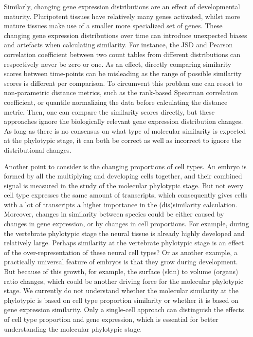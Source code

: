 Similarly, changing gene expression distributions are an effect of developmental maturity\cite{Kannan2021}. Pluripotent tissues have relatively many genes activated, whilst more mature tissues make use of a smaller more specialized set of genes. These changing gene expression distributions over time can introduce unexpected biases and artefacts when calculating similarity. For instance, the JSD and Pearson correlation coefficient between two count tables from different distributions can respectively never be zero or one. As an effect, directly comparing similarity scores between time-points can be misleading as the range of possible similarity scores is different per comparison. To circumvent this problem one can resort to non-parametric distance metrics, such as the rank-based Spearman correlation coefficient\cite{Irie2011}, or quantile normalizing the data before calculating the distance metric\cite{marletaz2018}. Then, one can compare the similarity scores directly, but these approaches ignore the biologically relevant gene expression distribution changes. As long as there is no consensus on what type of molecular similarity is expected at the phylotypic stage, it can both be correct as well as incorrect to ignore the distributional changes. 

Another point to consider is the changing proportions of cell types. An embryo is formed by all the multiplying and developing cells together, and their combined signal is measured in the study of the molecular phylotypic stage. But not every cell type expresses the same amount of transcripts\cite{Kim2023, Percharde2017}, which consequently gives cells with a lot of transcripts a higher importance in the (dis)similarity calculation. Moreover, changes in similarity between species could be either caused by changes in gene expression, or by changes in cell proportions. For example, during the vertebrate phylotypic stage the neural tissue is already highly developed and relatively large. Perhaps similarity at the vertebrate phylotypic stage is an effect of the over-representation of these neural cell types? Or as another example, a practically universal feature of embryos is that they grow during development. But because of this growth, for example, the surface (skin) to volume (organs) ratio changes, which could be another driving force for the molecular phylotypic stage. We currently do not understand whether the molecular similarity at the phylotypic is based on cell type proportion similarity or whether it is based on gene expression similarity. Only a single-cell approach can distinguish the effects of cell type proportion and gene expression, which is essential for better understanding the molecular phylotypic stage.

